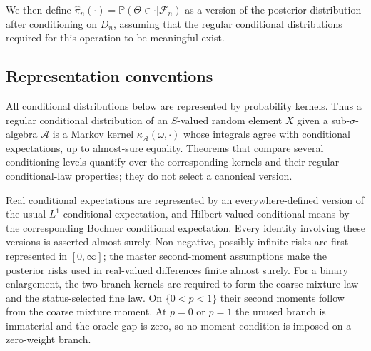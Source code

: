 \documentclass{article}
\newcommand{\1}{\mathbbm{1}}
\begin{document}
We then define $\hat{\pi}_n(\cdot)=\mathbb{P}(\Theta \in \cdot|\mathcal{F}_n)$ as a version of the posterior distribution after conditioning on $D_n$, assuming that the regular conditional distributions required for this operation to be meaningful exist.

\subsection*{Representation conventions}
All conditional distributions below are represented by probability kernels. Thus a regular
conditional distribution of an $S$-valued random element $X$ given a sub-$\sigma$-algebra
$\mathcal A$ is a Markov kernel $\kappa_{\mathcal A}(\omega,\cdot)$ whose integrals agree with
conditional expectations, up to almost-sure equality. Theorems that compare several conditioning
levels quantify over the corresponding kernels and their regular-conditional-law properties; they
do not select a canonical version.

Real conditional expectations are represented by an everywhere-defined version of the usual
$L^1$ conditional expectation, and Hilbert-valued conditional means by the corresponding Bochner
conditional expectation. Every identity involving these versions is asserted almost surely.
Non-negative, possibly infinite risks are first represented in $[0,\infty]$; the master
second-moment assumptions make the posterior risks used in real-valued differences finite almost
surely. For a binary enlargement, the two branch kernels are required to form the coarse mixture
law and the status-selected fine law. On $\{0<p<1\}$ their second moments follow from the coarse
mixture moment. At $p=0$ or $p=1$ the unused branch is immaterial and the oracle gap is zero, so no
moment condition is imposed on a zero-weight branch.
\end{document}
